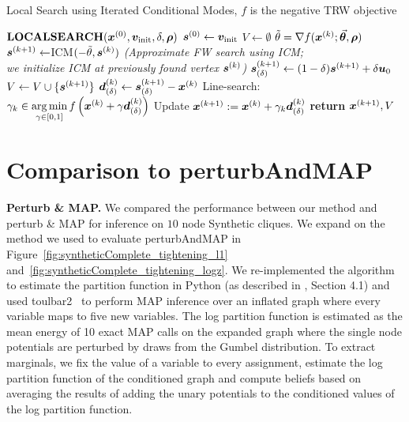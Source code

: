 \begin{algorithm}
	\caption{Local Search using Iterated Conditional Modes, $f$ is the negative TRW objective}
	\label{alg:algLocalSearch}
	\begin{algorithmic}[1]
		\STATE $\textbf{\textrm{LOCALSEARCH}}(\bm{x}^{(0)},\bm{v}_{\mathrm{init}},\delta,\bm{\rho})$
		\STATE $\bm{s}^{(0)}\leftarrow \bm{v}_{\mathrm{init}}$
		\STATE $V\leftarrow {\emptyset}$
		 \STATE $\tilde{\theta} = \nabla f(\bm{x}^{(k)};\vec{\bm{\theta}},\bm{\rho})$
		 \STATE $\bm{s}^{(k+1)}\leftarrow $ICM$(-\tilde{\theta},\bm{s}^{(k)})$ \quad\emph{\small (Approximate FW search using ICM; \\ \hspace{35mm} we initialize ICM at previously found vertex $\bm{s}^{(k)}$)}
		 \STATE $\bm{s}^{(k+1)}_{(\delta)} \leftarrow (1-\delta)\bm{s}^{(k+1)}+\delta\bm{u}_0$
		 \STATE $V\leftarrow V \cup \{\bm{s}^{(k+1)}\}$
		 \STATE $\bm{d}^{(k)}_{(\delta)}\leftarrow\bm{s}^{(k+1)}_{(\delta)}-\bm{x}^{(k)}$
		 \STATE Line-search: $\gamma_k \in \displaystyle\operatorname*{\arg\min}_{\gamma \in [0,1]} \textstyle f\left(\bm{x}^{(k)} + \gamma \bm{d}^{(k)}_{(\delta)}\right)$
 		 \STATE Update $\bm{x}^{(k+1)} := \bm{x}^{(k)} + \gamma_k  \bm{d}^{(k)}_{(\delta)}$  
		\ENDFOR 
		\STATE \textbf{return} $\bm{x}^{(k+1)},V$
	\end{algorithmic}
\end{algorithm}

%
%
%
%
%
%
%

\section{Comparison to perturbAndMAP}
%

\textbf{Perturb \& MAP.} We compared the performance between our method and perturb \& MAP for 
inference on $10$ node Synthetic cliques. We expand on the method we used to evaluate perturbAndMAP in Figure~\ref{fig:syntheticComplete_tightening_l1} 
and~\ref{fig:syntheticComplete_tightening_logz}. 
We re-implemented the algorithm to estimate the partition function in Python (as described in \citet{hazan2012partition}, Section 4.1) 
and used toulbar2~\citep{allouche2010toulbar2}
to perform MAP inference over an inflated graph where every variable maps to
five new variables. 
The log partition function is estimated as the mean energy of 10 exact MAP calls
on the expanded graph where the single node potentials are perturbed by draws from the Gumbel distribution.
To extract marginals, we fix the value of a variable to every assignment, estimate the log partition function 
of the conditioned graph and compute beliefs based on averaging the results of adding the unary potentials
to the conditioned values of the log partition function. 
%
%
%
%
%
%

